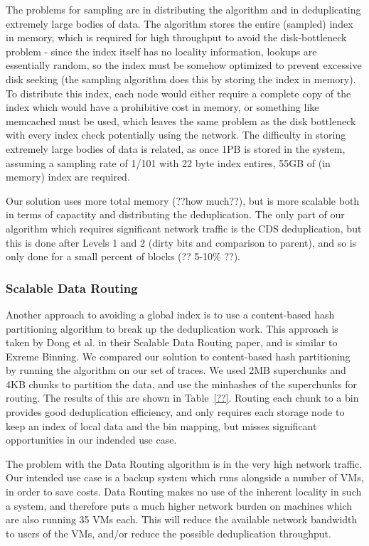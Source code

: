 The problems for sampling are in distributing the
algorithm and in deduplicating extremely large bodies of data. The algorithm
stores the entire (sampled) index in memory, which is required for high
throughput to avoid the disk-bottleneck problem - since the index itself has no
locality information, lookups are essentially random, so the index must be
somehow optimized to prevent excessive disk seeking (the sampling algorithm does
this by storing the index in memory). To distribute this index, each node would
either require a complete copy of the index which would have a prohibitive cost in
memory, or something like memcached must be used, which leaves the same problem
as the disk bottleneck with every index check potentially using the network.
The difficulty in storing extremely large bodies of data
is related, as once 1PB is stored in the system, assuming a sampling rate of 
1/101 with 22 byte index entires, 55GB of (in memory) index are required.

Our solution uses more total memory (??how much??), but is more scalable both in
terms of capactity and distributing the deduplication. The only part of our
algorithm which requires significant network traffic is the CDS deduplication,
but this is done after Levels 1 and 2 (dirty bits and comparison to parent), and
so is only done for a small percent of blocks (?? 5-10\% ??).

\subsubsection{Scalable Data Routing}
Another approach to avoiding a global index is to use a content-based hash
partitioning algorithm to break up the deduplication work. This approach is
taken by Dong et al. in their Scalable Data Routing paper, and is similar to
Exreme Binning\cite{??}\cite{extreme_binning09}. We compared our solution to
content-based hash partitioning by running the algorithm on our set of 
traces. We used 2MB superchunks and 4KB chunks to partition the data, and use
the minhashes of the superchunks for routing. The results of this are shown in
Table~\ref{??}. Routing each chunk to a bin provides good deduplication
efficiency, and only requires each storage node to keep an index of local data
and the bin mapping, but misses significant opportunities in our indended use
case.

The problem with the Data Routing algorithm is in the very high network traffic.
Our intended use case is a backup system which runs alongside a number of VMs,
in order to save costs. Data Routing makes no use of the inherent locality in
such a system, and therefore puts a much higher network burden on machines which
are also running 35 VMs each. This will reduce the available network bandwidth
to users of the VMs, and/or reduce the possible deduplication throughput.


